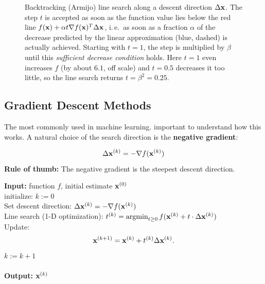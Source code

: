 \begin{figure}[htbp]
    \caption{Backtracking (Armijo) line search along a descent direction $\Delta\bm{\mathrm{x}}$. The step $t$ is accepted as soon as the function value lies below the red line $f(\bm{\mathrm{x}})+\alpha t\nabla f(\bm{\mathrm{x}})^T\Delta\bm{\mathrm{x}}$, i.\,e.\ as soon as a fraction $\alpha$ of the decrease predicted by the linear approximation (blue, dashed) is actually achieved. Starting with $t=1$, the step is multiplied by $\beta$ until this \emph{sufficient decrease condition} holds. Here $t=1$ even increases $f$ (by about $6.1$, off scale) and $t=0.5$ decreases it too little, so the line search returns $t=\beta^2=0.25$.}
    \label{fig:armijo}
  \end{figure}
 
\subsection{Gradient Descent Methods}
 The most commonly used in machine learning. important to understand how this works. A natural choice of the search direction is the   \textbf{negative gradient}:
  
  \begin{displaymath}
    \Delta \bm{\mathrm{x}}^{(k)} = -\nabla f(\bm{\mathrm{x}}^{(k)})
  \end{displaymath}
\textbf{Rule of thumb:} The negative gradient is the steepest descent direction.

  \begin{algorithmic}
    \STATE \textbf{Input:} function $f$, initial estimate $\bm{\mathrm{x}}^{(0)}$\\
    \STATE initialize: $k:=0$\\
    \Repeat
      \STATE Set descent direction: $\Delta\bm{\mathrm{x}}^{(k)}=- \nabla f(\bm{\mathrm{x}}^{(k)}) $\\
      \STATE Line search (1-D optimization): $t^{(k)}= \operatorname*{argmin}_{t \geq 0}f(\bm{\mathrm{x}}^{(k)}+t\cdot \Delta\bm{\mathrm{x}}^{(k)})$\\
      \STATE Update:
        \begin{displaymath}
          \bm{\mathrm{x}}^{(k+1)} = \bm{\mathrm{x}}^{(k)} + t^{(k)}\Delta \bm{\mathrm{x}}^{(k)} .
        \end{displaymath}
      \STATE $k:= k+1$\\
    \\
    \STATE \textbf{Output:} $\bm{\mathrm{x}}^{(k)}$\\
  \end{algorithmic}
 

